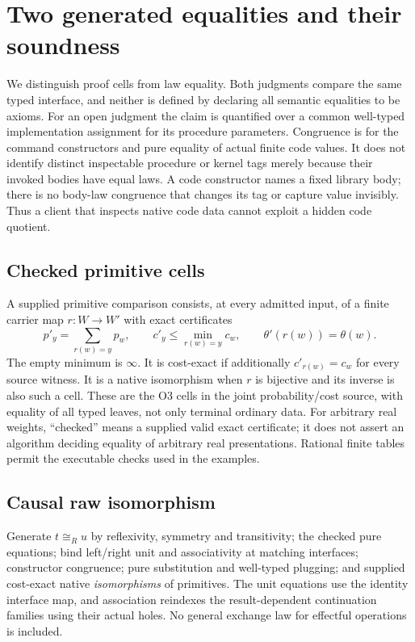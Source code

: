 \documentclass[11pt,a4paper]{article}
\theoremstyle{definition}
\begin{document}
\section{Two generated equalities and their soundness}\label{sec:equality}
We distinguish proof cells from law equality. Both judgments compare the
same typed interface, and neither is defined by declaring all semantic
equalities to be axioms. For an open judgment the claim is quantified over
a common well-typed implementation assignment for its procedure parameters.
Congruence is for the command constructors and pure equality of actual
finite code values. It does not identify distinct inspectable procedure
or kernel tags merely because their invoked bodies have equal laws.
A code constructor names a fixed library body; there is no body-law
congruence that changes its tag or capture value invisibly. Thus a client
that inspects native code data cannot exploit a hidden code quotient.

\subsection{Checked primitive cells}
A supplied primitive comparison consists, at every admitted input, of a
finite carrier map $r:W\to W'$ with exact certificates
\begin{equation}\label{eq:native}
 p'_y=\sum_{r(w)=y}p_w,
 \qquad c'_y\le\min_{r(w)=y}c_w,
 \qquad\theta'(r(w))=\theta(w).
\end{equation}
The empty minimum is $\infty$. It is cost-exact if additionally
$c'_{r(w)}=c_w$ for every source witness. It is a native isomorphism when
$r$ is bijective and its inverse is also such a cell. These are the O3
cells in the joint probability/cost source, with equality of all typed
leaves, not only terminal ordinary data. For arbitrary real weights,
``checked'' means a supplied valid exact certificate; it does not assert
an algorithm deciding equality of arbitrary real presentations. Rational
finite tables permit the executable checks used in the examples.

\subsection{Causal raw isomorphism}
Generate $t\cong_R u$ by reflexivity, symmetry and transitivity; the checked
pure equations; bind left/right unit and associativity at matching
interfaces; constructor congruence; pure substitution and well-typed
plugging; and supplied cost-exact native \emph{isomorphisms} of primitives.
The unit equations use the identity interface map, and association reindexes
the result-dependent continuation families using their actual holes.
No general exchange law for effectful operations is included.
\end{document}
